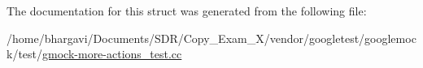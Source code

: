 The documentation for this struct was generated from the following file\+:\begin{DoxyCompactItemize}
\item 
/home/bhargavi/\+Documents/\+S\+D\+R/\+Copy\+\_\+\+Exam\+\_\+X/vendor/googletest/googlemock/test/\hyperlink{gmock-more-actions__test_8cc}{gmock-\/more-\/actions\+\_\+test.\+cc}\end{DoxyCompactItemize}
